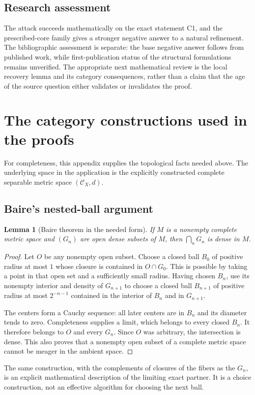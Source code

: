 \documentclass[11pt,a4paper]{article}
\newcommand{\CD}[1]{\mathcal C_{#1}}
\newtheorem{lemma}[theorem]{Lemma}
\theoremstyle{definition}\newtheorem{definition}[theorem]{Definition}
\theoremstyle{remark}\newtheorem{remark}[theorem]{Remark}
\begin{document}
\subsection{Research assessment}
The attack succeeds mathematically on the exact statement C1, and the prescribed-core family gives a stronger negative answer to a natural refinement. The bibliographic assessment is separate: the base negative answer follows from published work, while first-publication status of the structural formulations remains unverified. The appropriate next mathematical review is the local recovery lemma and its category consequences, rather than a claim that the age of the source question either validates or invalidates the proof.

\appendix
\section{The category constructions used in the proofs}
\label{app:category}
For completeness, this appendix supplies the topological facts needed above. The underlying space in the application is the explicitly constructed complete separable metric space $(\CD X,d)$.

\subsection{Baire's nested-ball argument}
\begin{lemma}[Baire theorem in the needed form]\label{lem:baire}
If $M$ is a nonempty complete metric space and $(G_n)$ are open dense subsets of $M$, then $\bigcap_nG_n$ is dense in $M$.
\end{lemma}
\begin{proof}
Let $O$ be any nonempty open subset. Choose a closed ball $B_0$ of positive radius at most $1$ whose closure is contained in $O\cap G_0$. This is possible by taking a point in that open set and a sufficiently small radius. Having chosen $B_n$, use its nonempty interior and density of $G_{n+1}$ to choose a closed ball $B_{n+1}$ of positive radius at most $2^{-n-1}$ contained in the interior of $B_n$ and in $G_{n+1}$.

The centers form a Cauchy sequence: all later centers are in $B_n$ and its diameter tends to zero. Completeness supplies a limit, which belongs to every closed $B_n$. It therefore belongs to $O$ and every $G_n$. Since $O$ was arbitrary, the intersection is dense. This also proves that a nonempty open subset of a complete metric space cannot be meager in the ambient space.
\end{proof}
The same construction, with the complements of closures of the fibers as the $G_n$, is an explicit mathematical description of the limiting exact partner. It is a choice construction, not an effective algorithm for choosing the next ball.
\end{document}
